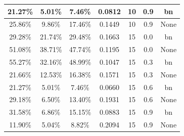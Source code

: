 \begin{table}[ht]
\begin{tabular}{|c|c|c|c|c|c|c|}
21.27\% & 5.01\% & 7.46\% & 0.0812 & 10 & 0.9 & bn\\ \hline
25.86\% & 9.86\% & 17.46\% & 0.1449 & 10 & 0.9 & None\\ \hline
29.28\% & 21.74\% & 29.48\% & 0.1663 & 15 & 0.0 & bn\\ \hline
51.08\% & 38.71\% & 47.74\% & 0.1195 & 15 & 0.0 & None\\ \hline
55.27\% & 32.16\% & 48.99\% & 0.1047 & 15 & 0.3 & bn\\ \hline
21.66\% & 12.53\% & 16.38\% & 0.1571 & 15 & 0.3 & None\\ \hline
21.27\% & 5.01\% & 7.46\% & 0.0660 & 15 & 0.6 & bn\\ \hline
29.18\% & 6.50\% & 13.40\% & 0.1931 & 15 & 0.6 & None\\ \hline
31.58\% & 6.86\% & 15.15\% & 0.0883 & 15 & 0.9 & bn\\ \hline
11.90\% & 5.04\% & 8.82\% & 0.2094 & 15 & 0.9 & None\\ \hline
\end{tabular}
\end{table}

